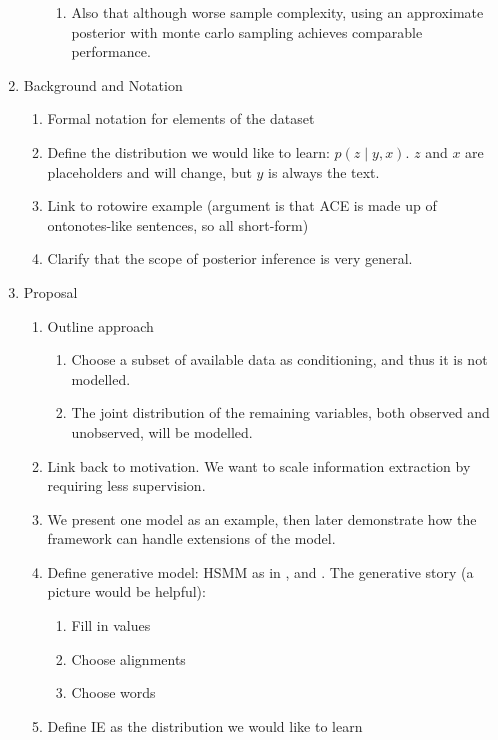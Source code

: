 \documentclass[11pt]{article}
\begin{document}
\begin{enumerate}
\begin{enumerate}
\begin{enumerate}
        \item Also that although worse sample complexity, using an approximate posterior
            with monte carlo sampling achieves comparable performance.
        \end{enumerate}
    \end{enumerate}
\item Background and Notation
    \begin{enumerate}
    \item Formal notation for elements of the dataset
    \item Define the distribution we would like to learn: $p(z\mid y, x)$.
        $z$ and $x$ are placeholders and will change, but $y$ is always the text.
    \item Link to rotowire example
        (argument is that ACE is made up of ontonotes-like sentences, so all short-form)
    \item Clarify that the scope of posterior inference is very general.
    \end{enumerate}
\item Proposal
    \begin{enumerate}
    \item Outline approach
        \begin{enumerate}
        \item Choose a subset of available data as conditioning,
            and thus it is not modelled.
        \item The joint distribution of the remaining variables,
            both observed and unobserved, will be modelled.
        \end{enumerate}
    \item Link back to motivation. We want to scale information extraction
        by requiring less supervision.
    \item We present one model as an example, then later demonstrate how the framework
        can handle extensions of the model.
    \item Define generative model: HSMM as in \citep{liang2009semalign},
        and \citep{wiseman2018template}.
        The generative story (a picture would be helpful):
        \begin{enumerate}
        \item Fill in values
        \item Choose alignments
        \item Choose words
        \end{enumerate}
    \item Define IE as the distribution we would like to learn

\end{enumerate}
\end{enumerate}
\end{document}
